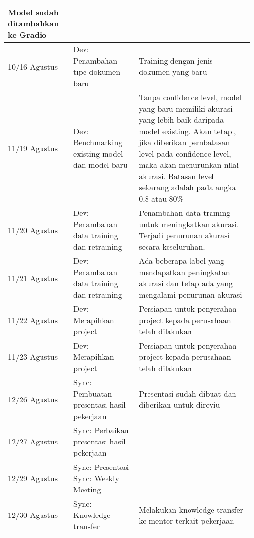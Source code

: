 \begin{longtable}{|p{5em}|p{10em}|p{15em}|}
Model sudah ditambahkan ke Gradio \\ \hline
        10/16 Agustus & Dev: Penambahan tipe dokumen baru & Training dengan jenis dokumen yang baru \\ \hline
        11/19 Agustus & Dev: Benchmarking existing model dan model baru & Tanpa confidence level, model yang baru memiliki akurasi yang lebih baik daripada model existing. Akan tetapi, jika diberikan pembatasan level pada confidence level, maka akan menurunkan nilai akurasi. Batasan level sekarang adalah pada angka 0.8 atau 80\% \\ \hline
        11/20 Agustus & Dev: Penambahan data training dan retraining & Penambahan data training untuk meningkatkan akurasi. Terjadi penurunan akurasi secara keseluruhan. \\ \hline
        11/21 Agustus & Dev: Penambahan data training dan retraining & Ada beberapa label yang mendapatkan peningkatan akurasi dan tetap ada yang mengalami penurunan akurasi \\ \hline
        11/22 Agustus & Dev: Merapihkan project & Persiapan untuk penyerahan project kepada perusahaan telah dilakukan \\ \hline
        11/23 Agustus & Dev: Merapihkan project & Persiapan untuk penyerahan project kepada perusahaan telah dilakukan \\ \hline
        12/26 Agustus & Sync: Pembuatan presentasi hasil pekerjaan & Presentasi sudah dibuat dan diberikan untuk direviu \\ \hline
        12/27 Agustus & Sync: Perbaikan presentasi hasil pekerjaan & \\ \hline
        12/29 Agustus & Sync: Presentasi \newline Sync: Weekly Meeting & \\ \hline
        12/30 Agustus & Sync: Knowledge transfer & Melakukan knowledge transfer ke mentor terkait pekerjaan \\ \hline
    \end{longtable}
